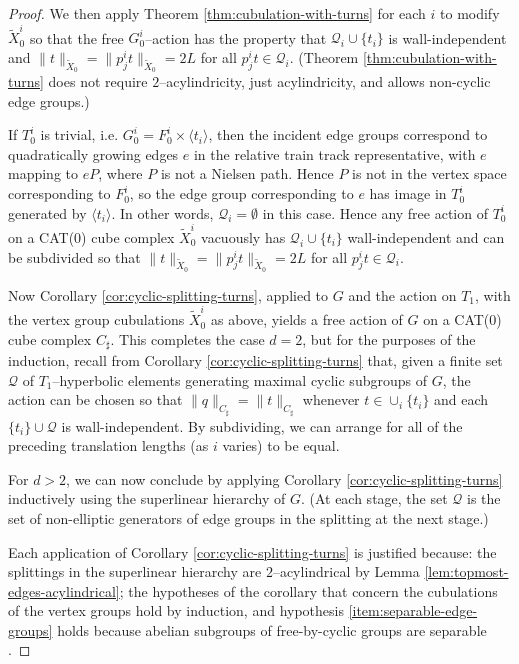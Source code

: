 \documentclass[11pt,oneside]{amsart}
\newcounter{ax}
\theoremstyle{definition}
\begin{document}
\begin{proof}
We then apply Theorem \ref{thm:cubulation-with-turns}  for each $i$ to modify $\widetilde X_0^i$ so that the free $G_0^i$--action has the property that $\mathcal Q_i\cup\{t_i\}$ is wall-independent and $\|t\|_{\widetilde X_0}=\|p^i_jt\|_{\widetilde X_0}=2L$ for all $p^i_jt\in\mathcal Q_i$.  (Theorem \ref{thm:cubulation-with-turns} does not require $2$--acylindricity, just acylindricity, and allows non-cyclic edge groups.)

If $T_0^i$ is trivial, i.e. $G_0^i=F_0^i\times\langle t_i\rangle$, then the incident edge groups correspond to quadratically growing edges $e$ in the relative train track representative, with $e$ mapping to $eP$, where $P$ is not a Nielsen path.  Hence $P$ is not in the vertex space corresponding to $F_0^i$, so the edge group corresponding to $e$ has image in $T_0^i$ generated by $\langle t_i\rangle$.  In other words, $\mathcal Q_i=\emptyset$ in this case.  Hence any free action of $T_0^i$ on a CAT(0) cube complex $\widetilde X_0^i$ vacuously has $\mathcal Q_i\cup\{t_i\}$ wall-independent and can be subdivided so that $\|t\|_{\widetilde X_0}=\|p^i_jt\|_{\widetilde X_0}=2L$ for all $p^i_jt\in\mathcal Q_i$.


Now Corollary \ref{cor:cyclic-splitting-turns}, applied to $G$ and the action on $T_1$, with the vertex group cubulations $\widetilde X_0^i$ as above, yields a free action of $G$ on a CAT(0) cube complex $C_\sharp$.  This completes the case $d=2$, but for the purposes of the induction, recall from Corollary \ref{cor:cyclic-splitting-turns} that, given a finite set $\mathcal Q$ of $T_1$--hyperbolic elements generating maximal cyclic subgroups of $G$, the action can be chosen so that $\|q\|_{C_\sharp}=\|t\|_{C_\sharp}$ whenever $t\in\cup_i\{t_i\}$ and each $\{t_i\}\cup\mathcal Q$ is wall-independent.  By subdividing, we can arrange for all of the preceding translation lengths (as $i$ varies) to be equal.

For $d>2$, we can now conclude by applying Corollary \ref{cor:cyclic-splitting-turns} inductively using the superlinear hierarchy of $G$.  (At each stage, the set $\mathcal Q$ is the set of non-elliptic generators of edge groups in the splitting at the next stage.)

Each application of Corollary \ref{cor:cyclic-splitting-turns} is justified because: the splittings in the superlinear hierarchy are $2$--acylindrical by Lemma \ref{lem:topmost-edges-acylindrical}; the hypotheses of the corollary that concern the cubulations of the vertex groups hold by induction, and hypothesis \eqref{item:separable-edge-groups} holds because abelian subgroups of free-by-cyclic groups are separable \cite[Cor. 2.10]{HughesKudlinska}.
\end{proof}
\end{document}
